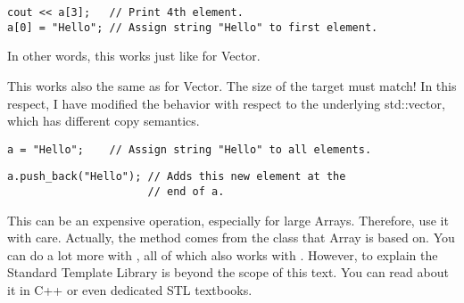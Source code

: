 \begin{verbatim}
cout << a[3];   // Print 4th element.
a[0] = "Hello"; // Assign string "Hello" to first element.
\end{verbatim}

In other words, this works just like for Vector.


This works also the same as for Vector. The size of the target must
match! In this respect, I have modified the behavior with respect to
the underlying std::vector, which has different copy semantics.

\begin{verbatim}
a = "Hello";    // Assign string "Hello" to all elements.
\end{verbatim}

\begin{verbatim}
a.push_back("Hello"); // Adds this new element at the
                      // end of a.
\end{verbatim}

This can be an expensive operation, especially for large Arrays.
Therefore, use it with care. Actually, the  method
comes from the  class that Array is based on. You
can do a lot more with , all of which also works
with . However, to explain the Standard Template Library
is beyond the scope of this text. You can read about it in C++ or even
dedicated STL textbooks.



